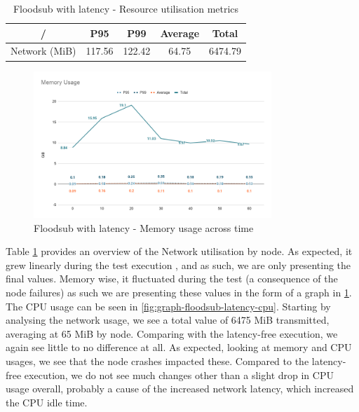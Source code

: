 \begin{table}[!htb]
\caption{Floodsub with latency - Resource utilisation metrics}
\label{table:floodsub-latency}
  \begin{center}
   \begin{tabular}{|c| c c c c|} 
   \hline
   / & P95 & P99 & Average & Total \\ [0.5ex] 
   \hline\hline
   Network (MiB) & 117.56 & 122.42 & 64.75 & 6474.79 \\
   \hline
  \end{tabular}
  \end{center}
\end{table}

\begin{figure}[!htb]
  \centering
  \includegraphics[width=0.8\textwidth]{img/graph-floodsub-latency-memory.png}
  \caption{Floodsub with latency - Memory usage across time}
  \label{fig:graph-floodsub-latency-memory}
\end{figure}

Table \ref{table:floodsub-latency} provides an overview of the Network
utilisation by node. As expected, it grew linearly during the test execution ,
and as such, we are only presenting the final values. Memory wise, it
fluctuated during the test (a consequence of the node failures) as such we are
presenting these values in the form of a graph in
\ref{fig:graph-floodsub-latency-memory}.  The CPU usage can be seen in
\ref{fig:graph-floodsub-latency-cpu}. Starting by analysing the network usage,
we see a total value of 6475 MiB transmitted, averaging at 65 MiB by node.
Comparing with the latency-free execution, we again see little to no difference
at all. As expected, looking at memory and CPU usages, we see that the node
crashes impacted these. Compared to the latency-free execution, we do not see
much changes other than a slight drop in CPU usage overall, probably a cause of
the increased network latency, which increased the CPU idle time.

